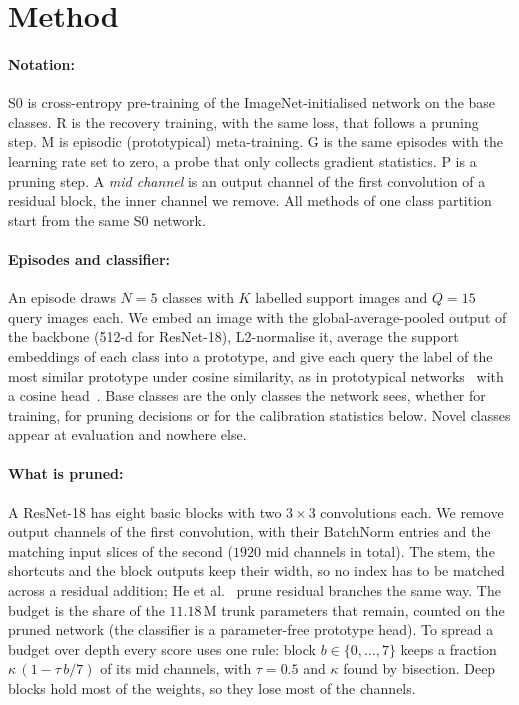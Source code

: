 \section{Method}
\label{sec:method}

\paragraph{Notation:}
S0 is cross-entropy pre-training of the ImageNet-initialised network on the base classes. R is the recovery training, with the same loss, that follows a pruning step. M is episodic (prototypical) meta-training. G is the same episodes with the learning rate set to zero, a probe that only collects gradient statistics. P is a pruning step. A \emph{mid channel} is an output channel of the first convolution of a residual block, the inner channel we remove. All methods of one class partition start from the same S0 network.

\paragraph{Episodes and classifier:}
An episode draws $N{=}5$ classes with $K$ labelled support images and $Q{=}15$ query images each. We embed an image with the global-average-pooled output of the backbone (512-d for ResNet-18), L2-normalise it, average the support embeddings of each class into a prototype, and give each query the label of the most similar prototype under cosine similarity, as in prototypical networks~\cite{snell2017proto} with a cosine head~\cite{chen2021metabaseline}. Base classes are the only classes the network sees, whether for training, for pruning decisions or for the calibration statistics below. Novel classes appear at evaluation and nowhere else.

\paragraph{What is pruned:}
A ResNet-18 has eight basic blocks with two $3{\times}3$ convolutions each. We remove output channels of the first convolution, with their BatchNorm entries and the matching input slices of the second ($1920$ mid channels in total). The stem, the shortcuts and the block outputs keep their width, so no index has to be matched across a residual addition; He et al.~\cite{he2017channel} prune residual branches the same way. The budget is the share of the $11.18$\,M trunk parameters that remain, counted on the pruned network (the classifier is a parameter-free prototype head). To spread a budget over depth every score uses one rule: block $b\in\{0,\dots,7\}$ keeps a fraction $\kappa\,(1-\tau\,b/7)$ of its mid channels, with $\tau{=}0.5$ and $\kappa$ found by bisection. Deep blocks hold most of the weights, so they lose most of the channels.

